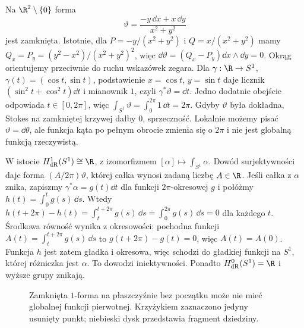 \begin{przyklad}
\label{prz:de-rham-s1}
Na $\R^2\setminus\{0\}$ forma
\[
 \vartheta=\frac{-y\,\dd x+x\,\dd y}{x^2+y^2}
\]
jest zamknięta. Istotnie, dla
$P=-y/(x^2+y^2)$ i $Q=x/(x^2+y^2)$ mamy
$Q_x=P_y=(y^2-x^2)/(x^2+y^2)^2$, więc
$\dd\vartheta=(Q_x-P_y)\dd x\wedge\dd y=0$.
Okrąg orientujemy przeciwnie do ruchu wskazówek zegara.
Dla $\gamma:\R\to S^1$, $\gamma(t)=(\cos t,\sin t)$,
podstawienie $x=\cos t$, $y=\sin t$ daje licznik
$(\sin^2t+\cos^2t)\dd t$ i mianownik $1$, czyli
$\gamma^*\vartheta=\dd t$.
Jedno dodatnie obejście odpowiada $t\in[0,2\pi]$, więc
$\int_{S^1}\vartheta=\int_0^{2\pi}1\,\dd t=2\pi$. Gdyby $\vartheta$
była dokładna, Stokes na zamkniętej krzywej
dałby $0$, sprzeczność. Lokalnie możemy
pisać $\vartheta=\dd\theta$, ale funkcja kąta
po pełnym obrocie zmienia się o $2\pi$ i nie
jest globalną funkcją rzeczywistą.

W istocie $H^1_{\mathrm{dR}}(S^1)\cong\R$,
z izomorfizmem $[\alpha]\mapsto\int_{S^1}\alpha$.
Dowód surjektywności daje forma
$(A/2\pi)\vartheta$, której całka wynosi zadaną liczbę $A\in\R$.
Jeśli całka z $\alpha$ znika, zapiszmy
$\gamma^*\alpha=g(t)\dd t$ dla funkcji
$2\pi$-okresowej $g$ i połóżmy
$h(t)=\int_0^t g(s)\,\dd s$. Wtedy
$h(t+2\pi)-h(t)=\int_t^{t+2\pi}g(s)\,\dd s
=\int_0^{2\pi}g(s)\,\dd s=0$ dla każdego $t$.
Środkowa równość wynika z okresowości:
pochodna funkcji $A(t)=\int_t^{t+2\pi}g(s)\,\dd s$
to $g(t+2\pi)-g(t)=0$, więc $A(t)=A(0)$.
Funkcja $h$ jest zatem gładka i okresowa, więc schodzi
do gładkiej funkcji na $S^1$, której różniczka jest $\alpha$.
To dowodzi iniektywności. Ponadto
$H^0_{\mathrm{dR}}(S^1)=\R$ i wyższe grupy znikają.
\end{przyklad}

\begin{figure}[!htbp]
\centering
{}
\caption{Zamknięta $1$-forma na płaszczyźnie bez początku
może nie mieć globalnej funkcji pierwotnej.
Krzyżykiem zaznaczono jedyny usunięty punkt; niebieski
dysk przedstawia fragment dziedziny.}
\label{fig:de-rham-kat}
\end{figure}

